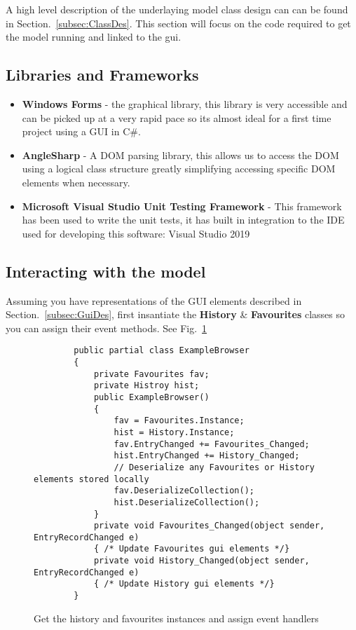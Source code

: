\documentclass[../Main.tex]{subfiles}
\begin{document}
A high level description of the underlaying model class design can can be found in Section.~\ref{subsec:ClassDes}. This section will focus on the code required to get the model running and linked to the gui.

\subsection{Libraries and Frameworks}
\begin{itemize}
    \item \textbf{Windows Forms} - the graphical library, this library is very accessible and can be picked up at a very rapid pace so its almost ideal for a first time project using a GUI in C\#.
    \item \textbf{AngleSharp} - A DOM parsing library, this allows us to access the DOM using a logical class structure greatly simplifying accessing specific DOM elements when necessary.
    \item \textbf{Microsoft Visual Studio Unit Testing Framework} - This framework has been used to write the unit tests, it has built in integration to the IDE used for developing this software: Visual Studio 2019
\end{itemize}

\subsection{Interacting with the model}

Assuming you have representations of the GUI elements described in Section.~\ref{subsec:GuiDes}, first insantiate the \textbf{History} \& \textbf{Favourites} classes so you can assign their event methods. See Fig.~\ref{fig:instantiateHistFav}

\begin{figure}[H]
    \begin{verbatim}
        public partial class ExampleBrowser
        {
            private Favourites fav;
            private Histroy hist;
            public ExampleBrowser()
            {
                fav = Favourites.Instance;
                hist = History.Instance;
                fav.EntryChanged += Favourites_Changed;
                hist.EntryChanged += History_Changed;
                // Deserialize any Favourites or History elements stored locally
                fav.DeserializeCollection();
                hist.DeserializeCollection();
            }
            private void Favourites_Changed(object sender, EntryRecordChanged e) 
            { /* Update Favourites gui elements */}
            private void History_Changed(object sender, EntryRecordChanged e) 
            { /* Update History gui elements */}
        }
    \end{verbatim}
    \caption{Get the history and favourites instances and assign event handlers}
    \label{fig:instantiateHistFav}
\end{figure}
\end{document}
